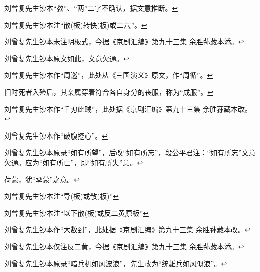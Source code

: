 \item
  \leavevmode\hypertarget{fn643}{}%
  刘曾复先生钞本``教''、``两''二字不确认，据文意推断。\protect\hyperlink{fnref643}{↩}
\item
  \leavevmode\hypertarget{fn644}{}%
  刘曾复先生钞本注``散(板)转快(板)或二六''。\protect\hyperlink{fnref644}{↩}
\item
  \leavevmode\hypertarget{fn645}{}%
  刘曾复先生钞本未注明板式，今据《京剧汇编》第九十三集
  余胜荪藏本添。\protect\hyperlink{fnref645}{↩}
\item
  \leavevmode\hypertarget{fn646}{}%
  刘曾复先生钞本原文如此，文意欠通。\protect\hyperlink{fnref646}{↩}
\item
  \leavevmode\hypertarget{fn647}{}%
  刘曾复先生钞本作``周巡''，此处从《三国演义》原文，作``周循''。\protect\hyperlink{fnref647}{↩}
\item
  \leavevmode\hypertarget{fn648}{}%
  旧时死者入殓后，其亲属穿着符合各自身分的丧服，称为``成服''。\protect\hyperlink{fnref648}{↩}
\item
  \leavevmode\hypertarget{fn649}{}%
  刘曾复先生钞本作``千刃此贼''，此处据《京剧汇编》第九十三集
  余胜荪藏本改。\protect\hyperlink{fnref649}{↩}
\item
  \leavevmode\hypertarget{fn650}{}%
  刘曾复先生钞本作``破腹挖心''。\protect\hyperlink{fnref650}{↩}
\item
  \leavevmode\hypertarget{fn651}{}%
  刘曾复先生钞本原录``如有所望''，后改``如有所忘''，段公平君注：``如有所忘''文意欠通。应为``如有所亡''，即``如有所失''意。\protect\hyperlink{fnref651}{↩}
\item
  \leavevmode\hypertarget{fn652}{}%
  荷蒙，犹``承蒙''之意。\protect\hyperlink{fnref652}{↩}
\item
  \leavevmode\hypertarget{fn653}{}%
  刘曾复先生钞本注``导(板)或散(板)''\protect\hyperlink{fnref653}{↩}
\item
  \leavevmode\hypertarget{fn654}{}%
  刘曾复先生钞本注``以下散(板)或反二黄原板''\protect\hyperlink{fnref654}{↩}
\item
  \leavevmode\hypertarget{fn655}{}%
  刘曾复先生钞本作``大数到''，此处据《京剧汇编》第九十三集
  余胜荪藏本改。\protect\hyperlink{fnref655}{↩}
\item
  \leavevmode\hypertarget{fn656}{}%
  刘曾复先生钞本仅注反二黄，今据《京剧汇编》第九十三集
  余胜荪藏本添。\protect\hyperlink{fnref656}{↩}
\item
  \leavevmode\hypertarget{fn657}{}%
  刘曾复先生钞本原录``暗兵机如风波浪''，先生改为``统雄兵如风似浪''。\protect\hyperlink{fnref657}{↩}
\item
